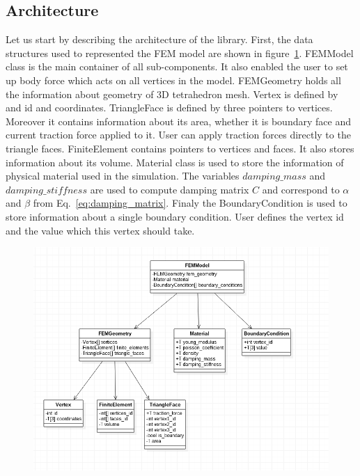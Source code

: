 \documentclass[en]{minipw} %
\begin{document}
\subsection{Architecture}
Let us start by describing the architecture of the library. First, the data structures used to represented the FEM model are shown in figure~\ref{fig:uml_fem_model}. FEMModel class is the main container of all sub-components. It also enabled the user to set up body force which acts on all vertices in the model. FEMGeometry holds all the information about geometry of 3D tetrahedron mesh. Vertex is defined by and id and coordinates. TriangleFace is defined by three pointers to vertices. Moreover it contains information about its area, whether it is boundary face and current traction force applied to it. User can apply traction forces directly to the triangle faces. FiniteElement contains pointers to vertices and faces. It also stores information about its volume. Material class is used to store the information of physical material used in the simulation. The variables $damping\_mass$ and $damping\_stiffness$ are used to compute damping matrix $C$ and correspond to $\alpha$ and $\beta$ from Eq.~\ref{eq:damping_matrix}. Finaly the BoundaryCondition is used to store information about a single boundary condition. User defines the vertex id and the value which this vertex should take.

\begin{figure}[h!]
\centering
\includegraphics[scale=0.6]{pictures/fem_model.png}
\caption[Logo MiNI]{}
\label{fig:uml_fem_model}
\end{figure}
\end{document}
